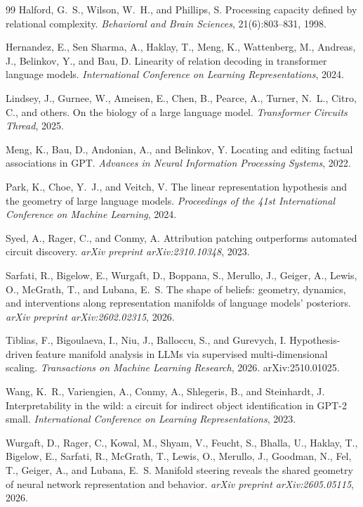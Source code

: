 \documentclass[11pt]{article}
\begin{document}
\begin{thebibliography}{99}
Halford, G.~S., Wilson, W.~H., and Phillips, S.
\newblock Processing capacity defined by relational complexity.
\newblock \emph{Behavioral and Brain Sciences}, 21(6):803--831, 1998.

Hernandez, E., Sen Sharma, A., Haklay, T., Meng, K., Wattenberg, M., Andreas, J., Belinkov, Y., and Bau, D.
\newblock Linearity of relation decoding in transformer language models.
\newblock \emph{International Conference on Learning Representations}, 2024.

Lindsey, J., Gurnee, W., Ameisen, E., Chen, B., Pearce, A., Turner, N.~L., Citro, C., and others.
\newblock On the biology of a large language model.
\newblock \emph{Transformer Circuits Thread}, 2025.

Meng, K., Bau, D., Andonian, A., and Belinkov, Y.
\newblock Locating and editing factual associations in GPT.
\newblock \emph{Advances in Neural Information Processing Systems}, 2022.

Park, K., Choe, Y.~J., and Veitch, V.
\newblock The linear representation hypothesis and the geometry of large language models.
\newblock \emph{Proceedings of the 41st International Conference on Machine Learning}, 2024.

Syed, A., Rager, C., and Conmy, A.
\newblock Attribution patching outperforms automated circuit discovery.
\newblock \emph{arXiv preprint arXiv:2310.10348}, 2023.

Sarfati, R., Bigelow, E., Wurgaft, D., Boppana, S., Merullo, J., Geiger, A., Lewis, O., McGrath, T., and Lubana, E.~S.
\newblock The shape of beliefs: geometry, dynamics, and interventions along representation manifolds of language models' posteriors.
\newblock \emph{arXiv preprint arXiv:2602.02315}, 2026.

Tiblias, F., Bigoulaeva, I., Niu, J., Balloccu, S., and Gurevych, I.
\newblock Hypothesis-driven feature manifold analysis in LLMs via supervised multi-dimensional scaling.
\newblock \emph{Transactions on Machine Learning Research}, 2026. arXiv:2510.01025.

Wang, K.~R., Variengien, A., Conmy, A., Shlegeris, B., and Steinhardt, J.
\newblock Interpretability in the wild: a circuit for indirect object identification in GPT-2 small.
\newblock \emph{International Conference on Learning Representations}, 2023.

Wurgaft, D., Rager, C., Kowal, M., Shyam, V., Feucht, S., Bhalla, U., Haklay, T., Bigelow, E., Sarfati, R., McGrath, T., Lewis, O., Merullo, J., Goodman, N., Fel, T., Geiger, A., and Lubana, E.~S.
\newblock Manifold steering reveals the shared geometry of neural network representation and behavior.
\newblock \emph{arXiv preprint arXiv:2605.05115}, 2026.

\end{thebibliography}
\end{document}
